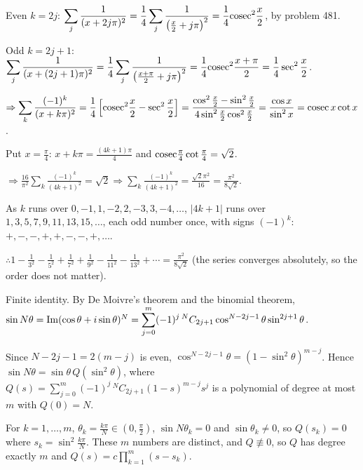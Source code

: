   Even $k = 2j$: $\displaystyle\sum_j\frac{1}{(x + 2j\pi)^2} = \frac{1}{4}\sum_j\frac{1}{\left(\frac{x}{2} +
    j\pi\right)^2} = \frac{1}{4}{\rm cosec}^2\frac{x}{2}$, by problem 481.

  Odd $k = 2j + 1$: $\displaystyle\sum_j\frac{1}{(x + (2j + 1)\pi)^2} = \frac{1}{4}\sum_j\frac{1}{\left(\frac{x
      + \pi}{2} + j\pi\right)^2} = \frac{1}{4}{\rm cosec}^2\frac{x + \pi}{2} = \frac{1}{4}\sec^2\frac{x}{2}$.

  $\Rightarrow\displaystyle\sum_k\frac{(-1)^k}{(x + k\pi)^2} = \frac{1}{4}\left[{\rm cosec}^2\frac{x}{2} -
  \sec^2\frac{x}{2}\right] = \frac{\cos^2\frac{x}{2} - \sin^2\frac{x}{2}}{4\sin^2\frac{x}{2}\cos^2\frac{x}{2}}
  = \frac{\cos x}{\sin^2x} = {\rm cosec}\,x\cot x$.

  Put $x = \frac{\pi}{4}$: $x + k\pi = \frac{(4k + 1)\pi}{4}$ and ${\rm cosec}\frac{\pi}{4}\cot\frac{\pi}{4} =
  \sqrt{2}$.

  $\Rightarrow\frac{16}{\pi^2}\displaystyle\sum_k\frac{(-1)^k}{(4k + 1)^2} = \sqrt{2}\Rightarrow\sum_k\frac{(-1)^k}{(4k
    + 1)^2} = \frac{\sqrt{2}\pi^2}{16} = \frac{\pi^2}{8\sqrt{2}}$.

  As $k$ runs over $0, -1, 1, -2, 2, -3, 3, -4, \ldots$, $|4k + 1|$ runs over $1, 3, 5, 7, 9, 11, 13, 15,
  \ldots$, each odd number once, with signs $(-1)^k$: $+, -, -, +, +, -, -, +, \ldots$.

  $\therefore 1 - \frac{1}{3^2} - \frac{1}{5^2} + \frac{1}{7^2} + \frac{1}{9^2} - \frac{1}{11^2} -
  \frac{1}{13^2} + \cdots = \frac{\pi^2}{8\sqrt{2}}$ (the series converges absolutely, so the order does not
  matter).
\item Finite identity. By De Moivre's theorem and the binomial theorem, $\sin N\theta = {\rm
    Im}(\cos\theta + i\sin\theta)^N = \displaystyle\sum_{j = 0}^m(-1)^j\,{}^NC_{2j + 1}\cos^{N - 2j -
    1}\theta\sin^{2j + 1}\theta$.

  Since $N - 2j - 1 = 2(m - j)$ is even, $\cos^{N - 2j - 1}\theta = (1 - \sin^2\theta)^{m - j}$. Hence
  $\sin N\theta = \sin\theta\,Q(\sin^2\theta)$, where $Q(s) = \displaystyle\sum_{j = 0}^m(-1)^j\,{}^NC_{2j +
    1}(1 - s)^{m - j}s^j$ is a polynomial of degree at most $m$ with $Q(0) = N$.

  For $k = 1, \ldots, m$, $\theta_k = \frac{k\pi}{N}\in\left(0, \frac{\pi}{2}\right)$, $\sin N\theta_k = 0$ and
  $\sin\theta_k\neq 0$, so $Q(s_k) = 0$ where $s_k = \sin^2\frac{k\pi}{N}$. These $m$ numbers are distinct, and
  $Q\not\equiv 0$, so $Q$ has degree exactly $m$ and $Q(s) = c\displaystyle\prod_{k = 1}^m(s - s_k)$.

